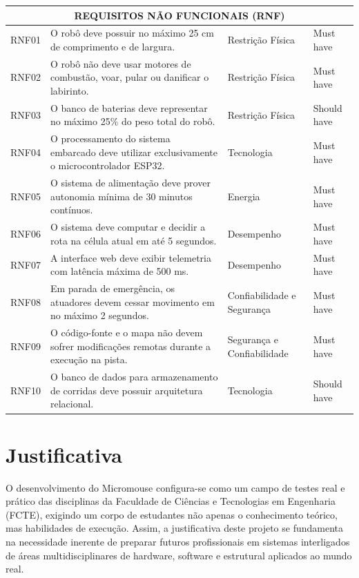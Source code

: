 \begin{landscape}
\begin{longtable}{@{\extracolsep{\fill}}|l|p{14.5cm}|l|l|}
        \multicolumn{4}{|c|}{\textbf{REQUISITOS NÃO FUNCIONAIS (RNF)}} \\ \hline
        RNF01 & O robô deve possuir no máximo 25 cm de comprimento e de largura. & Restrição Física & Must have \\ \hline
        RNF02 & O robô não deve usar motores de combustão, voar, pular ou danificar o labirinto. & Restrição Física & Must have \\ \hline
        RNF03 & O banco de baterias deve representar no máximo 25\% do peso total do robô. & Restrição Física & Should have \\ \hline
        RNF04 & O processamento do sistema embarcado deve utilizar exclusivamente o microcontrolador ESP32. & Tecnologia & Must have \\ \hline
        RNF05 & O sistema de alimentação deve prover autonomia mínima de 30 minutos contínuos. & Energia & Must have \\ \hline
        RNF06 & O sistema deve computar e decidir a rota na célula atual em até 5 segundos. & Desempenho & Must have \\ \hline
        RNF07 & A interface web deve exibir telemetria com latência máxima de 500 ms. & Desempenho & Must have \\ \hline
        RNF08 & Em parada de emergência, os atuadores devem cessar movimento em no máximo 2 segundos. & Confiabilidade e Segurança & Must have \\ \hline
        RNF09 & O código-fonte e o mapa não devem sofrer modificações remotas durante a execução na pista. & Segurança e Confiabilidade & Must have \\ \hline
        RNF10 & O banco de dados para armazenamento de corridas deve possuir arquitetura relacional. & Tecnologia & Should have \\ \hline

    \end{longtable}
\end{landscape}

\section{Justificativa}

O desenvolvimento do Micromouse configura-se como um campo de testes real e prático das disciplinas da Faculdade de Ciências e Tecnologias em Engenharia (FCTE), exigindo um corpo de estudantes não apenas o conhecimento teórico, mas habilidades de execução. Assim, a justificativa deste projeto
se fundamenta na necessidade inerente de preparar futuros profissionais em sistemas interligados de áreas multidisciplinares de hardware, software e estrutural aplicados ao mundo real.

